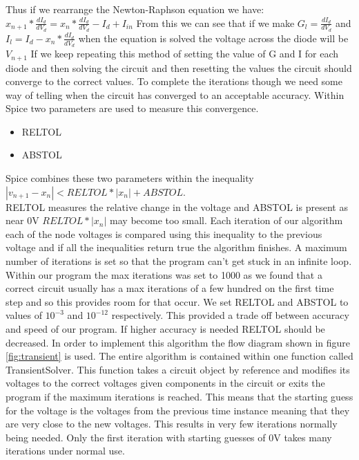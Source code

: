 \documentclass{article}
\begin{document}
\bigbreak
Thus if we rearrange the Newton-Raphson equation we have:\bigbreak
$x_{n+1}*\frac{d I_d}{d V_d} = x_n*\frac{d I_d}{d V_d} - I_d + I_{in}$\bigbreak
From this we can see that if we make $G_l = \frac{d I_d}{d V_d}$ and $I_l = I_d - x_n*\frac{d I_d}{d V_d}$ when the equation is solved the voltage across the diode will be $V_{n+1}$\bigbreak
If we keep repeating this method of setting the value of G and I for each diode and then solving the circuit and then resetting the values the circuit should converge to the correct values. To complete the iterations though we need some way of telling when the circuit has converged to an acceptable accuracy. 
Within Spice two parameters are used to measure this convergence.
\begin{itemize}
    \item RELTOL
    \item ABSTOL
\end{itemize}
Spice combines these two parameters within the inequality $|v_{n+1}-x_n| < RELTOL*|x_n| + ABSTOL$.\\
RELTOL measures the relative change in the voltage and ABSTOL is present as near 0V $RELTOL*|x_n|$ may become too small. Each iteration of our algorithm each of the node voltages is compared using this inequality to the previous voltage and if all the inequalities return true the algorithm finishes. A maximum number of iterations is set so that the program can't get stuck in an infinite loop. Within our program the max iterations was set to 1000 as we found that a correct circuit usually has a max iterations of a few hundred on the first time step and so this provides room for that occur. We set RELTOL and ABSTOL to values of $10^{-3}$ and $10^{-12}$ respectively. This provided a trade off between accuracy and speed of our program. If higher accuracy is needed RELTOL should be decreased. 
\bigbreak
In order to implement this algorithm the flow diagram shown in figure \ref{fig:transient} is used. The entire algorithm is contained within one function called TransientSolver. This function takes a circuit object by reference and modifies its voltages to the correct voltages given components in the circuit or exits the program if the maximum iterations is reached. This means that the starting guess for the voltage is the voltages from the previous time instance meaning that they are very close to the new voltages. This results in very few iterations normally being needed. Only the first iteration with starting guesses of 0V takes many iterations under normal use. \\
\end{document}
